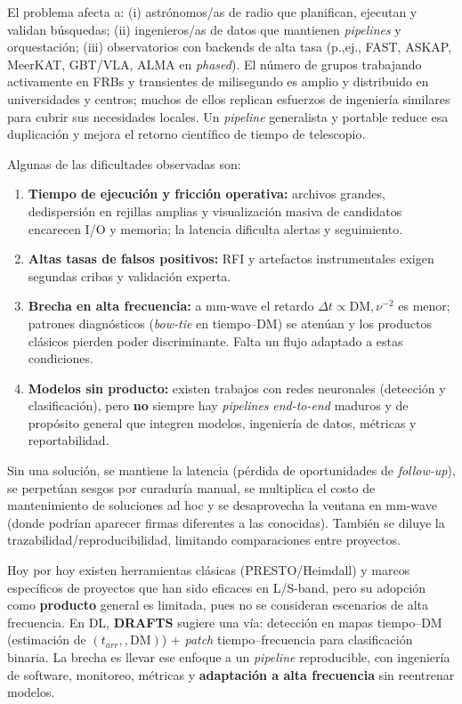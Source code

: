 \medskip

El problema afecta a: (i) astrónomos/as de radio que planifican, ejecutan y validan búsquedas; (ii) ingenieros/as de datos que mantienen \textit{pipelines} y orquestación; (iii) observatorios con backends de alta tasa (p.,ej., FAST, ASKAP, MeerKAT, GBT/VLA, ALMA en \emph{phased}). El número de grupos trabajando activamente en FRBs y transientes de milisegundo es amplio y distribuido en universidades y centros; muchos de ellos replican esfuerzos de ingeniería similares para cubrir sus necesidades locales. Un \textit{pipeline} generalista y portable reduce esa duplicación y mejora el retorno científico de tiempo de telescopio.

\medskip

Algunas de las dificultades observadas son:

\begin{enumerate}
\item \textbf{Tiempo de ejecución y fricción operativa:} archivos grandes, dedispersión en rejillas amplias y visualización masiva de candidatos encarecen I/O y memoria; la latencia dificulta alertas y seguimiento.
\item \textbf{Altas tasas de falsos positivos:} RFI y artefactos instrumentales exigen segundas cribas y validación experta.
\item \textbf{Brecha en alta frecuencia:} a mm-wave el retardo $\Delta t\propto \mathrm{DM},\nu^{-2}$ es menor; patrones diagnósticos (\emph{bow-tie} en tiempo--DM) se atenúan y los productos clásicos pierden poder discriminante. Falta un flujo adaptado a estas condiciones.
\item \textbf{Modelos sin producto:} existen trabajos con redes neuronales (detección y clasificación), pero \textbf{no} siempre hay \textit{pipelines} \emph{end-to-end} maduros y de propósito general que integren modelos, ingeniería de datos, métricas y reportabilidad.
\end{enumerate}

\medskip
Sin una solución, se mantiene la latencia (pérdida de oportunidades de \emph{follow-up}), se perpetúan sesgos por curaduría manual, se multiplica el costo de mantenimiento de soluciones ad hoc y se desaprovecha la ventana en mm-wave (donde podrían aparecer firmas diferentes a las conocidas). También se diluye la trazabilidad/reproducibilidad, limitando comparaciones entre proyectos.

\medskip
Hoy por hoy existen herramientas clásicas (PRESTO/Heimdall) y marcos específicos de proyectos que han sido eficaces en L/S-band, pero su adopción como \textbf{producto} general es limitada, pues no se consideran escenarios de alta frecuencia. En DL, \textbf{DRAFTS} sugiere una vía: detección en mapas tiempo--DM (estimación de $(t_{arr},,\mathrm{DM})$) + \emph{patch} tiempo--frecuencia para clasificación binaria. La brecha es llevar ese enfoque a un \textit{pipeline} reproducible, con ingeniería de software, monitoreo, métricas y \textbf{adaptación a alta frecuencia} sin reentrenar modelos.

